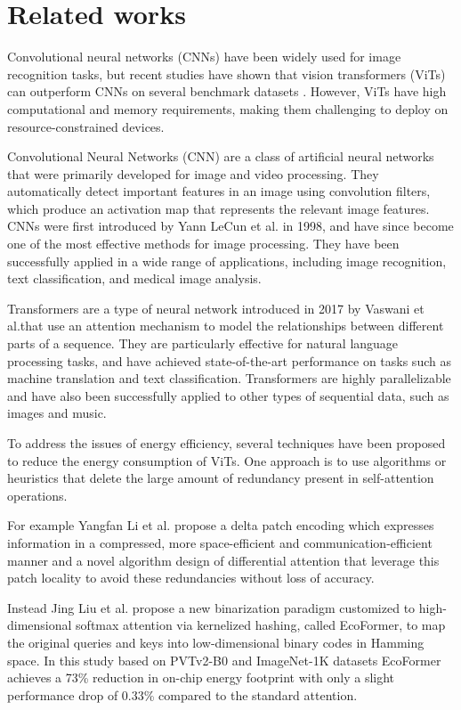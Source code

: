 \section{Related works}
\label{relatedwork}
Convolutional neural networks (CNNs) have been widely used for image recognition tasks, but recent studies have shown that vision transformers (ViTs) can outperform CNNs on several benchmark datasets \cite{9790134}. However, ViTs have high computational and memory requirements, making them challenging to deploy on resource-constrained devices.

Convolutional Neural Networks (CNN) are a class of artificial neural networks that were primarily developed for image and video processing. They automatically detect important features in an image using convolution filters, which produce an activation map that represents the relevant image features. CNNs were first introduced by Yann LeCun et al. \cite{lecun1995convolutional} in 1998, and have since become one of the most effective methods for image processing. They have been successfully applied in a wide range of applications, including image recognition, text classification, and medical image analysis.  

Transformers are a type of neural network introduced in 2017 by Vaswani et al.\cite{DBLP:journals/corr/VaswaniSPUJGKP17}that use an attention mechanism to model the relationships between different parts of a sequence. They are particularly effective for natural language processing tasks, and have achieved state-of-the-art performance on tasks such as machine translation and text classification. Transformers are highly parallelizable and have also been successfully applied to other types of sequential data, such as images and music.

To address the issues of energy efficiency, several techniques have been proposed to reduce the energy consumption of ViTs. One approach is to use algorithms or heuristics that delete the large amount of redundancy present in self-attention operations. 

For example Yangfan Li et al.\cite{li2022divit} propose a delta patch encoding which expresses information in a compressed, more space-efficient and communication-efficient manner and a novel algorithm design of differential attention that leverage this patch locality to avoid these redundancies without loss of accuracy. 

Instead Jing Liu et al. \cite{liu2022ecoformer} propose a new binarization paradigm customized to high-dimensional
softmax attention via kernelized hashing, called EcoFormer, to map the original queries and keys into low-dimensional binary codes in Hamming space. In this study based on PVTv2-B0 and
ImageNet-1K datasets EcoFormer achieves a 73\% reduction in on-chip energy footprint with only a slight performance drop of 0.33\% compared to the standard attention.

